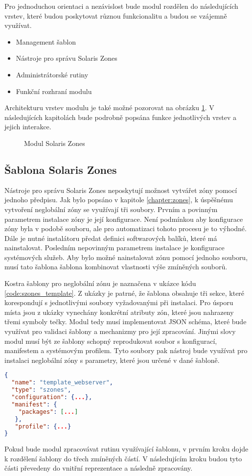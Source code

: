 Pro jednoduchou orientaci a nezávislost bude modul rozdělen do následujících vrstev, které budou poskytovat různou funkcionalitu
a budou se vzájemně využívat. 
\begin{itemize}
 \item Management šablon
 \item Nástroje pro správu Solaris Zones
 \item Administrátorské rutiny
 \item Funkční rozhraní modulu
\end{itemize}
Architekturu vrstev modulu je také možné pozorovat na obrázku \ref{image:implemetation:szones}. V následujících kapitolách
bude podrobně popsána funkce jednotlivých vrstev a jejich interakce.
\begin{figure}
    \centering    
    \caption{Modul Solaris Zones}
    \label{image:implemetation:szones}
\end{figure}
\subsection{Šablona Solaris Zones}
\label{chapter:implementation:szones:template}
Nástroje pro správu Solaris Zones neposkytují možnost vytvářet zóny pomocí jednoho předpisu. Jak bylo popsáno v kapitole
\ref{chapter:zones}, k úspěšnému vytvoření neglobální zóny se využívají tři soubory. Prvním a povinným parametrem instalace zóny
je její konfigurace. Není podmínkou aby konfigurace zóny byla v podobě souboru, ale pro automatizaci tohoto procesu je to výhodné.
Dále je nutné instalátoru předat definici softwarových balíků, které má nainstalovat. Posledním nepovinným parametrem instalace
je konfigurace systémových služeb. Aby bylo možné nainstalovat zónu pomocí jednoho souboru, musí tato šablona šablona kombinovat
vlastnosti výše zmíněných souborů. 

Kostra šablony pro neglobální zónu je naznačena v ukázce kódu \ref{code:szones_template}. Z ukázky je patrné, že šablona obsahuje
tři sekce, které korespondují s jednotlivými soubory vyžadovanými při instalaci. Pro úsporu místa jsou z ukázky vynechány konkrétní
atributy zón, které jsou nahrazeny třemi symboly tečky. Modul tedy musí implementovat JSON schéma, které bude využívat pro
validaci šablony a mechanizmy pro její zpracování. Jinými slovy modul musí být ze šablony schopný reprodukovat soubor s 
konfigurací, manifestem a systémovým profilem. Tyto soubory pak nástroj bude využívat pro instalaci neglobální zóny s parametry,
které jsou určené v dané šabloně.
\begin{lstlisting}[language=json, caption={Kostra šablony neglobální zóny}, float,label={code:szones_template}]  
{  
  "name": "template_webserver",
  "type": "szones",
  "configuration": {...},
  "manifest": {
    "packages": [...]
   },
   "profile": {...} 
}
\end{lstlisting}
Pokud bude modul zpracovávat rutinu využívající šablonu, v prvním kroku dojde k rozdělení šablony do třech zmíněných částí.
V následujícím kroku budou tyto části převedeny do vnitřní reprezentace a následně zpracovány.
